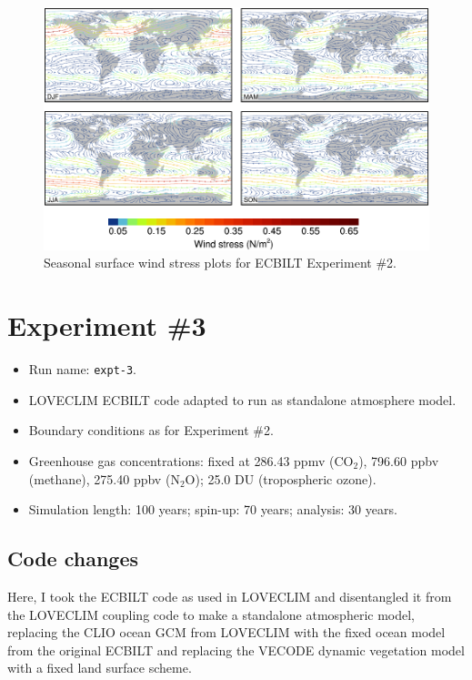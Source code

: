 \documentclass[a4paper,11pt]{article}
\begin{document}
\begin{figure}
  \begin{center}
    \includegraphics[width=\textwidth]{../expt-2/plots/stress-plots}
  \end{center}
  \caption{Seasonal surface wind stress plots for ECBILT Experiment
    \#2.}
  \label{fig:stress-2}
\end{figure}


\section{Experiment \#3}

\begin{itemize}
  \item{Run name: \texttt{expt-3}.}
  \item{LOVECLIM ECBILT code adapted to run as standalone atmosphere
    model.}
  \item{Boundary conditions as for Experiment \#2.}
  \item{Greenhouse gas concentrations: fixed at 286.43 ppmv
    ($\mathrm{CO_2}$), 796.60 ppbv (methane), 275.40 ppbv
    ($\mathrm{N_2O}$); 25.0 DU (tropospheric ozone).}
  \item{Simulation length: 100 years; spin-up: 70 years; analysis: 30
    years.}
\end{itemize}

\subsection{Code changes}

Here, I took the ECBILT code as used in LOVECLIM and disentangled it
from the LOVECLIM coupling code to make a standalone atmospheric
model, replacing the CLIO ocean GCM from LOVECLIM with the fixed ocean
model from the original ECBILT and replacing the VECODE dynamic
vegetation model with a fixed land surface scheme.
\end{document}
